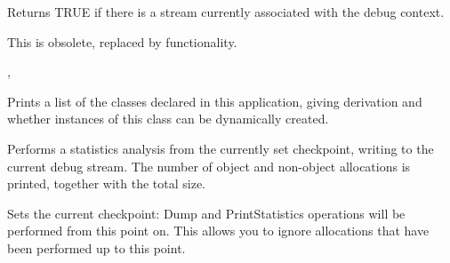 Returns TRUE if there is a stream currently associated
with the debug context.

This is obsolete, replaced by  functionality.


, 

\label{wxdebugcontextprintclasses}


Prints a list of the classes declared in this application, giving derivation
and whether instances of this class can be dynamically created.



\label{wxdebugcontextprintstatistics}


Performs a statistics analysis from the currently set checkpoint, writing
to the current debug stream. The number of object and non-object
allocations is printed, together with the total size.





\label{wxdebugcontextsetcheckpoint}


Sets the current checkpoint: Dump and PrintStatistics operations will
be performed from this point on. This allows you to ignore allocations
that have been performed up to this point.



\label{wxdebugcontextsetcheckprevious}

